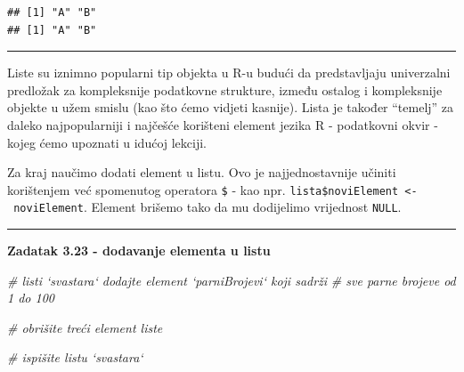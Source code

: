 \documentclass[]{book}
\newenvironment{Shaded}{\begin{snugshade}}{\end{snugshade}}
\newcommand{\KeywordTok}[1]{\textcolor[rgb]{0.13,0.29,0.53}{\textbf{#1}}}
\newcommand{\DecValTok}[1]{\textcolor[rgb]{0.00,0.00,0.81}{#1}}
\newcommand{\StringTok}[1]{\textcolor[rgb]{0.31,0.60,0.02}{#1}}
\newcommand{\CommentTok}[1]{\textcolor[rgb]{0.56,0.35,0.01}{\textit{#1}}}
\newcommand{\OtherTok}[1]{\textcolor[rgb]{0.56,0.35,0.01}{#1}}
\newcommand{\OperatorTok}[1]{\textcolor[rgb]{0.81,0.36,0.00}{\textbf{#1}}}
\newcommand{\NormalTok}[1]{#1}
\theoremstyle{definition}
\theoremstyle{definition}
\theoremstyle{definition}
\theoremstyle{remark}
\begin{document}
\begin{verbatim}
## [1] "A" "B"
## [1] "A" "B"
\end{verbatim}

\begin{center}\rule{0.5\linewidth}{\linethickness}\end{center}

Liste su iznimno popularni tip objekta u R-u budući da predstavljaju
univerzalni predložak za kompleksnije podatkovne strukture, između
ostalog i kompleksnije objekte u užem smislu (kao što ćemo vidjeti
kasnije). Lista je također ``temelj'' za daleko najpopularniji i
najčešće korišteni element jezika R - podatkovni okvir - kojeg ćemo
upoznati u idućoj lekciji.

Za kraj naučimo dodati element u listu. Ovo je najjednostavnije učiniti
korištenjem već spomenutog operatora \texttt{\$} - kao npr.
\texttt{lista\$noviElement\ \textless{}-\ noviElement}. Element brišemo
tako da mu dodijelimo vrijednost \texttt{NULL}.

\begin{center}\rule{0.5\linewidth}{\linethickness}\end{center}

\textbf{Zadatak 3.23 - dodavanje elementa u listu}

\begin{Shaded}
\begin{Highlighting}[]
\CommentTok{# listi `svastara` dodajte element `parniBrojevi` koji sadrži}
\CommentTok{# sve parne brojeve od 1 do 100}

\CommentTok{# obrišite treći element liste}


\CommentTok{# ispišite listu `svastara`}
\end{Highlighting}
\end{Shaded}

\begin{Shaded}
\end{Shaded}
\end{document}
